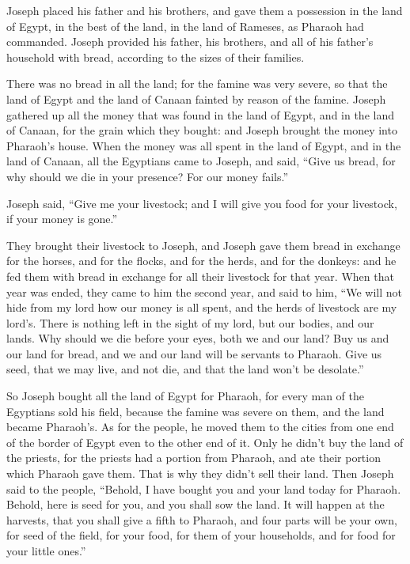  Joseph placed his father and his brothers, and gave them
a possession in the land of Egypt, in the best of the land, in the land
of Rameses, as Pharaoh had commanded.  Joseph provided
his father, his brothers, and all of his father's household with bread,
according to the sizes of their families.

 There was no bread in all the land; for the famine was
very severe, so that the land of Egypt and the land of Canaan fainted by
reason of the famine.  Joseph gathered up all the money
that was found in the land of Egypt, and in the land of Canaan, for the
grain which they bought: and Joseph brought the money into Pharaoh's
house.  When the money was all spent in the land of
Egypt, and in the land of Canaan, all the Egyptians came to Joseph, and
said, ``Give us bread, for why should we die in your presence? For our
money fails.''

 Joseph said, ``Give me your livestock; and I will give
you food for your livestock, if your money is gone.''

 They brought their livestock to Joseph, and Joseph gave
them bread in exchange for the horses, and for the flocks, and for the
herds, and for the donkeys: and he fed them with bread in exchange for
all their livestock for that year.  When that year was
ended, they came to him the second year, and said to him, ``We will not
hide from my lord how our money is all spent, and the herds of livestock
are my lord's. There is nothing left in the sight of my lord, but our
bodies, and our lands.  Why should we die before your
eyes, both we and our land? Buy us and our land for bread, and we and
our land will be servants to Pharaoh. Give us seed, that we may live,
and not die, and that the land won't be desolate.''

 So Joseph bought all the land of Egypt for Pharaoh, for
every man of the Egyptians sold his field, because the famine was severe
on them, and the land became Pharaoh's.  As for the
people, he moved them to the cities from one end of the border of Egypt
even to the other end of it.  Only he didn't buy the land
of the priests, for the priests had a portion from Pharaoh, and ate
their portion which Pharaoh gave them. That is why they didn't sell
their land.  Then Joseph said to the people, ``Behold, I
have bought you and your land today for Pharaoh. Behold, here is seed
for you, and you shall sow the land.  It will happen at
the harvests, that you shall give a fifth to Pharaoh, and four parts
will be your own, for seed of the field, for your food, for them of your
households, and for food for your little ones.''


